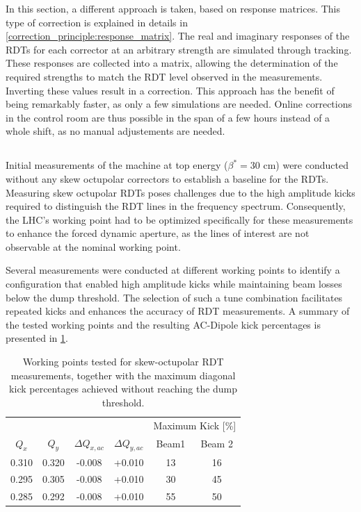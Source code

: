 In this section, a different approach is taken, based on response matrices. This type of correction
is explained in details in \cref{correction_principle:response_matrix}. The real and imaginary 
responses of the RDTs for each corrector at an arbitrary strength are simulated through tracking.
These responses are collected into a matrix, allowing the determination of the required strengths to
match the RDT level observed in the measurements. Inverting these values result in a correction.
This approach has the benefit of being remarkably faster, as only a few simulations are needed.
Online corrections in the control room are thus possible in the span of a few hours instead of a
whole shift, as no manual adjustements are needed.


\FloatBarrier
\subsection{}

Initial measurements of the machine at top energy ($\beta^*=30$ cm) were conducted without any
skew octupolar correctors to establish a baseline for the RDTs. Measuring skew octupolar RDTs poses
challenges due to the high amplitude kicks required to distinguish the RDT lines in the frequency
spectrum. Consequently, the LHC's working point had to be optimized specifically for these
measurements to enhance the forced dynamic aperture, as the lines of interest are not observable at
the nominal working point.

Several measurements were conducted at different working points to identify a configuration that
enabled high amplitude kicks while maintaining beam losses below the dump threshold. The selection
of such a tune combination facilitates repeated kicks and enhances the accuracy of RDT measurements.
A summary of the tested working points and the resulting AC-Dipole kick percentages is presented in
\cref{tab:skew_octupolar:working_points_acd}.

\begin{table}[!htb]
    \centering
    \begin{tabular}{cccccc}
      \hline
      &&&&\multicolumn{2}{c}{Maximum Kick [\%]} \\
      \cline{5-6}
      $Q_x$ & $Q_y$ & $\Delta Q_{x,ac}$ & $\Delta Q_{y,ac}$ & Beam1 & Beam 2 \\
      \hline
      0.310 & 0.320 &-0.008 & +0.010 & 13 & 16 \\
      0.295 & 0.305 &-0.008 & +0.010 & 30 & 45 \\
      0.285 & 0.292 &-0.008 & +0.010 & 55 & 50 \\
      \hline
    \end{tabular}
    \caption{Working points tested for skew-octupolar RDT measurements, together with the maximum
    diagonal kick percentages achieved without reaching the dump threshold.}
    \label{tab:skew_octupolar:working_points_acd}
\end{table}


